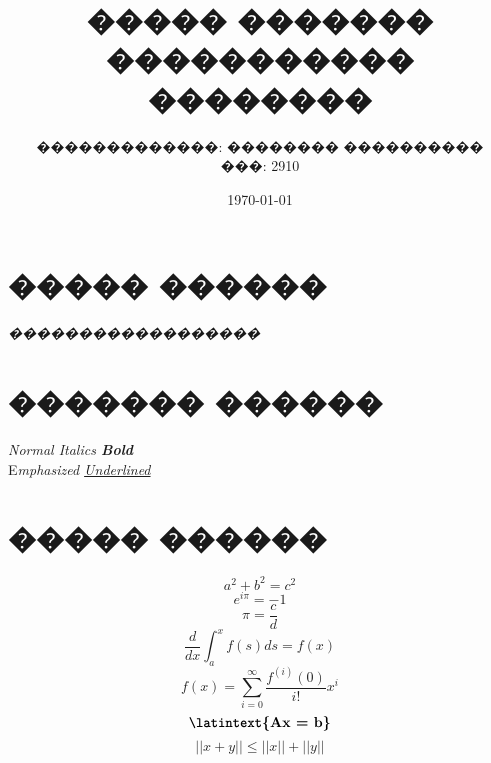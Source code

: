 \documentclass[a4paper,11pt]{article}
\title{����� ������� ����������� ��������} %
\author{�������������: �������� ����������  \\  ���: 2910}       %
\date{\today}                                      %
\newcommand{\lt}{\latintext}
\newcommand{\gt}{\greektext}
\begin{document}

\maketitle

\section{����� ������}

	\emph{{\tiny �}{\scriptsize �}{\footnotesize �}{\small �}{\normalsize �}{\large �}{\Large �}{\LARGE �}{\huge �}{\huge �}{\LARGE �}{\Large �}{\large �}{\normalsize �}{\small �}{\footnotesize �}{\scriptsize �}{\tiny �}}

\vspace{20pt}

\section{������� ������}

	\begin{center}	
		\lt
		\textit{Normal Italics \textbf{Bold\\}}
		{E}\textit{mphasized \underline{Underlined}}
	\end{center}

\vspace{20pt}

\section{����� ������}
	
	\begin{equation*}
	a^2 + b^2 = c^2
	\end{equation*}
	\begin{equation*}
	e^{i\pi} = -1
	\end{equation*}
	\begin{equation*}
	\pi = \frac{c}{d}
	\end{equation*}
	\begin{equation*}
	\dfrac{d}{dx}\int_{a}^{x} f(s) ds = f(x)
	\end{equation*}
	\begin{equation*}
	f(x) = \sum_{i=0}^{\infty } {\dfrac{f^{(i)}(0)}{i!} x^i }
	\end{equation*}
	\begin{equation*}
	\textbf{\lt{Ax = b}}
	\end{equation*}
	\begin{equation*}
	||{x+y}||\leq||x||+||y||
	\end{equation*}
	
\end{document}
